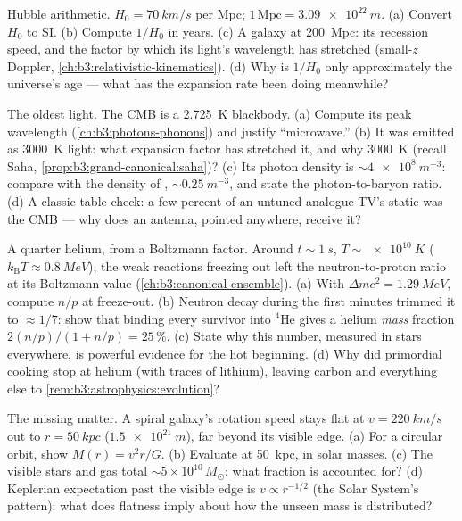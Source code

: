 \begin{exercise}[$\star\star\star$]\label{exo:b3:astrophysics:9}
Hubble arithmetic. $H_0 = \qty{70}{km/s}$ per Mpc; $1\,
\text{Mpc} = \qty{3.09e22}{m}$. (a) Convert $H_0$ to SI. (b)
Compute $1/H_0$ in years. (c) A galaxy at \qty{200}{Mpc}: its
recession speed, and the factor by which its light's wavelength
has stretched (small-$z$ Doppler,
\cref{ch:b3:relativistic-kinematics}). (d) Why is $1/H_0$ only
approximately the universe's age --- what has the expansion
rate been doing meanwhile?
\end{exercise}

\begin{exercise}[$\star\star\star$]\label{exo:b3:astrophysics:10}
The oldest light. The CMB is a \qty{2.725}{K} blackbody. (a)
Compute its peak wavelength (\cref{ch:b3:photons-phonons}) and
justify ``microwave.'' (b) It was emitted as
\qty{3000}{K} light: what expansion factor has stretched it,
and why \qty{3000}{K} (recall Saha,
\cref{prop:b3:grand-canonical:saha})? (c) Its photon density is
$\sim\qty{4e8}{m^{-3}}$: compare with the density of ,
$\sim\qty{0.25}{m^{-3}}$, and state the photon-to-baryon ratio.
(d) A classic table-check: a few percent of an untuned analogue
TV's static was the CMB --- why does an antenna, pointed
anywhere, receive it?
\end{exercise}

\begin{exercise}[$\star\star\star$]\label{exo:b3:astrophysics:11}
A quarter helium, from a Boltzmann factor. Around $t \sim
\qty{1}{s}$, $T \sim \qty{e10}{K}$ ($k_{\text{B}}T \approx
\qty{0.8}{MeV}$), the weak reactions freezing out left the
neutron-to-proton ratio at its Boltzmann value
(\cref{ch:b3:canonical-ensemble}). (a) With $\Delta mc^2 =
\qty{1.29}{MeV}$, compute $n/p$ at freeze-out. (b) Neutron decay
during the first minutes trimmed it to $\approx1/7$: show that
binding every survivor into $^4$He gives a helium \emph{mass}
fraction $2(n/p)/(1 + n/p) = 25\,\%$. (c) State why this number,
measured in stars everywhere, is powerful evidence for the hot
beginning. (d) Why did primordial cooking stop at helium
(with traces of lithium), leaving carbon and everything else to
\cref{rem:b3:astrophysics:evolution}?
\end{exercise}

\begin{exercise}[$\star\star\star$]\label{exo:b3:astrophysics:12}
The missing matter. A spiral galaxy's rotation speed stays flat
at $v = \qty{220}{km/s}$ out to $r = \qty{50}{kpc}$
($\qty{1.5e21}{m}$), far beyond its visible edge. (a) For a
circular orbit, show $M(r) = v^2r/G$. (b) Evaluate at
\qty{50}{kpc}, in solar masses. (c) The visible stars and gas
total $\sim5\times10^{10}\,M_\odot$: what fraction is
accounted for? (d) Keplerian expectation past the visible edge
is $v \propto r^{-1/2}$ (the Solar System's pattern): what does
flatness imply about how the unseen mass is distributed?
\end{exercise}

